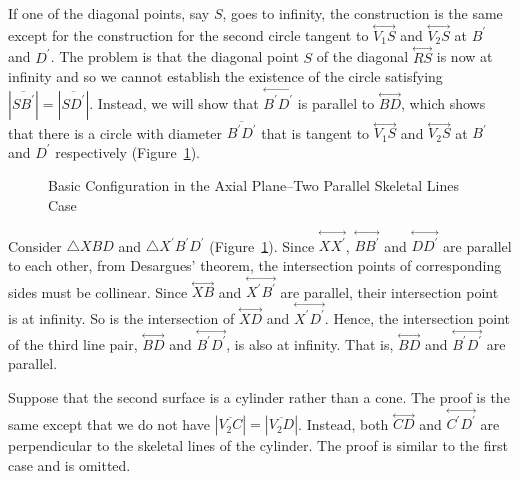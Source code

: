      If one of the diagonal points, say $S$, goes to infinity, the construction
is the same except for the construction for the second circle tangent to
$\stackrel{\longleftrightarrow}{V_1S}$ and 
$\stackrel{\longleftrightarrow}{V_2S}$ at $B^\prime$ and $D^\prime$.
The problem is that the diagonal point $S$ of the diagonal
$\stackrel{\longleftrightarrow}{RS}$ is now at infinity and so we cannot
establish the existence of the circle satisfying
$|\overline{SB^\prime}|=|\overline{SD^\prime}|$.  Instead, we will show that
$\stackrel{\longleftrightarrow}{B^\prime D^\prime}$ is parallel to
$\stackrel{\longleftrightarrow}{BD}$, which shows that there is a circle with
diameter $\overline{B^\prime D^\prime}$ that is tangent to
$\stackrel{\longleftrightarrow}{V_1S}$ and
$\stackrel{\longleftrightarrow}{V_2S}$ at $B^\prime$ and $D^\prime$
respectively (Figure~\ref{fig:int-config-para}).
\begin{figure}
\vspace{8cm}
\caption{Basic Configuration in the Axial Plane--Two Parallel Skeletal Lines Case}
\label{fig:int-config-para}
\end{figure}

     Consider $\bigtriangleup XBD$ and 
$\bigtriangleup X^\prime B^\prime D^\prime$
(Figure~\ref{fig:int-config-para}).  
Since $\stackrel{\longleftrightarrow}{XX^\prime}$,
$\stackrel{\longleftrightarrow}{BB^\prime}$ and
$\stackrel{\longleftrightarrow}{DD^\prime}$ are parallel to each other,
from Desargues' theorem, the intersection points of corresponding sides must 
be collinear.  Since $\stackrel{\longleftrightarrow}{XB}$ and
$\stackrel{\longleftrightarrow}{X^\prime B^\prime}$ are parallel, their 
intersection point is at infinity.  So is the intersection of
$\stackrel{\longleftrightarrow}{XD}$ and
$\stackrel{\longleftrightarrow}{X^\prime D^\prime}$.  Hence, the intersection
point of the third line pair, $\stackrel{\longleftrightarrow}{BD}$ and
$\stackrel{\longleftrightarrow}{B^\prime D^\prime}$, is also at infinity.
That is, $\stackrel{\longleftrightarrow}{BD}$ and
$\stackrel{\longleftrightarrow}{B^\prime D^\prime}$ are parallel.  

     Suppose that the second surface is a cylinder rather than a cone.
The proof is the 
same except that we do not have $|\overline{V_2C}|=|\overline{V_2D}|$.  
Instead, both $\stackrel{\longleftrightarrow}{CD}$ and
$\stackrel{\longleftrightarrow}{C^\prime D^\prime}$ are perpendicular to
the skeletal lines of the cylinder.  The proof is similar to the first case and
is omitted.

